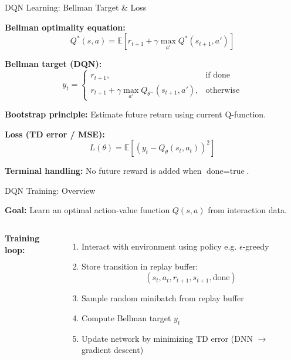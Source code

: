 \documentclass[aspectratio=169]{beamer}
\begin{document}
\begin{frame}{DQN Learning: Bellman Target \& Loss}

  \textbf{Bellman optimality equation:}
  \[
  Q^*(s,a) =
  \mathbb{E}\left[
  r_{t+1} + \gamma \max_{a'} Q^*(s_{t+1}, a')
  \right]
  \]

  \vspace{0.8em}

  \textbf{Bellman target (DQN):}
  \[
  y_t =
  \begin{cases}
  r_{t+1}, & \text{if done} \\
  r_{t+1} + \gamma \max_{a'} Q_{\theta^-}(s_{t+1}, a'), & \text{otherwise}
  \end{cases}
  \]

  \vspace{0.8em}

  \textbf{Bootstrap principle:}
  Estimate future return using current Q-function.

  \vspace{0.5em}

  \textbf{Loss (TD error / MSE):}
  \[
  L(\theta) =
  \mathbb{E}\left[
  \left(
  y_t - Q_\theta(s_t, a_t)
  \right)^2
  \right]
  \]

  \vspace{0.8em}

  \textbf{Terminal handling:}
  No future reward is added when $\text{done} = \text{true}$.
\end{frame}

\begin{frame}{DQN Training: Overview}

  \textbf{Goal:} Learn an optimal action-value function $Q(s,a)$ from interaction data.

  \vspace{0.8em}

  \begin{columns}[c]

    \textbf{Training loop:}
    \begin{enumerate}
      \item Interact with environment using policy e.g. $\epsilon$-greedy
      \item Store transition in replay buffer:
      \[
      (s_t, a_t, r_{t+1}, s_{t+1}, \text{done})
      \]
      \item Sample random minibatch from replay buffer
      \item Compute Bellman target $y_t$
      \item Update network by minimizing TD error (DNN $\rightarrow$ gradient descent)
    \end{enumerate}
  \end{columns}

\end{frame}
\end{document}
